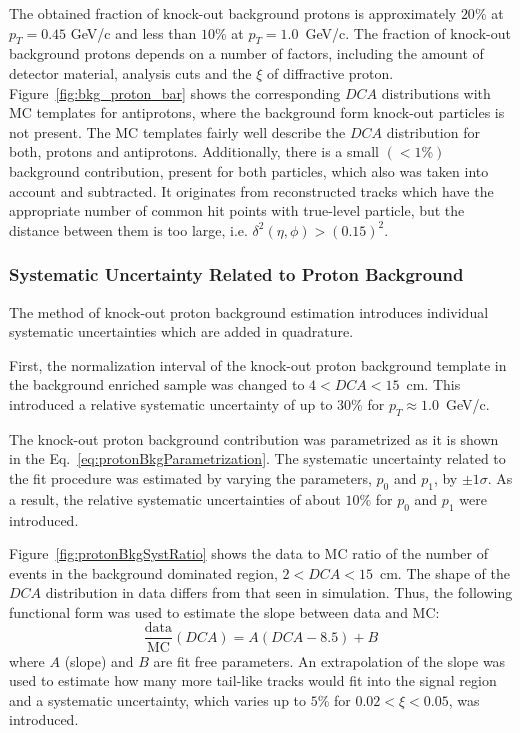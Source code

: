  The obtained fraction of knock-out background protons is approximately $20\%$ at $p_T = 0.45$ GeV/c
 and less than $10\%$ at $p_T = 1.0$~GeV/c. The fraction of knock-out background protons depends on a number of factors, including the amount of detector material, analysis cuts and the $\xi$ of diffractive proton. 
 Figure~\ref{fig:bkg_proton_bar} shows the corresponding $DCA$ distributions with MC templates for antiprotons, where the background form knock-out particles is not present. The MC templates  fairly well describe the $DCA$ distribution for both, protons and antiprotons. Additionally, there is a small $\left(<1\%\right)$ background  contribution, present for both particles, which also was taken into account and subtracted. It originates from reconstructed tracks which have the appropriate number of common hit points with true-level particle, but the distance between them is too large, i.e. $\delta^2\left(\eta,\phi\right)>\left(0.15\right)^2$.
 \captionsetup{format=default,indention=0pt,justification=justified}
 \FloatBarrier
 
 \subsubsection{Systematic Uncertainty Related to Proton Background} 
The method of   knock-out proton background estimation  introduces individual systematic uncertainties which are added in quadrature. 

First, the normalization interval of the  knock-out   proton  background template in the background enriched sample was changed to $4<DCA<15$~cm. This introduced a relative systematic uncertainty of up to $30\%$ for $p_T\approx 1.0$~GeV/c. 

The  knock-out proton background contribution was  parametrized as  it is shown in the Eq.~\ref{eq:protonBkgParametrization}. The systematic uncertainty related to the fit procedure was estimated by varying the   parameters, $p_0$ and $p_1$, by $\pm1\sigma$. As a result, the  relative systematic uncertainties of about $10\%$ for $p_0$ and $p_1$ were introduced.


 
 Figure~\ref{fig:protonBkgSystRatio} shows the data to MC ratio of  the  number of events in the background dominated region, $2<DCA<15$~cm. The shape of the $DCA$ distribution in data  differs from that seen in simulation. Thus, the following functional form was used to estimate the slope between data and MC:
\begin{equation}
\frac{\textrm{data}}{\textrm{MC}}\left(DCA\right) = A(DCA-8.5)+B
\label{eq:slopeBkgFit}
\end{equation}
where $A$ (slope) and  $B$ are fit free parameters. An extrapolation of the slope was used to estimate how many
more tail-like tracks would fit into the signal region and a systematic uncertainty, which varies up to $5\%$ for $0.02< \xi<0.05$, was introduced. 

